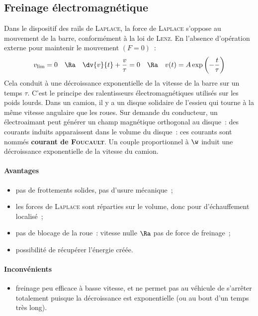 \documentclass[../main/main.tex]{subfiles}
\begin{document}
\subsection{Freinage électromagnétique}
\label{ssec:electrofrein}
Dans le dispositif des rails de \textsc{Laplace}, la force de \textsc{Laplace}
s'oppose au mouvement de la barre, conformément à la loi de \textsc{Lenz}. En
l'absence d'opération externe pour maintenir le mouvement $(F=0)$~:
\[
	v_{\rm lim} = 0
	\quad \Ra \quad
	\dv{v}{t} + \frac{v}{\tau} = 0
	\quad \Ra \quad
	v(t) = A\exp\left(-\frac{t}{\tau}\right)
\]
Cela conduit à une décroissance exponentielle de la vitesse de la barre sur un
temps $\tau$.
\bigbreak
C'est le principe des ralentisseurs électromagnétiques utilisés sur les poids
lourds. Dans un camion, il y a un disque solidaire de l'essieu qui tourne à la
même vitesse angulaire que les roues. Sur demande du conducteur, un
électroaimant peut générer un champ magnétique orthogonal au disque~: des
courants induits apparaissent dans le volume du disque~: ces courants sont
nommés \textbf{courant de \textsc{Foucault}}. Un couple proportionnel à $\w$
induit une décroissance exponentielle de la vitesse du camion.
\bigbreak
\paragraph*{Avantages}
\begin{itemize}[label=$\diamond$, leftmargin=10pt]
	\item pas de frottements solides, pas d'usure mécanique~;
	\item les forces de \textsc{Laplace} sont réparties sur le volume, donc pour
	      d'échauffement localisé~;
	\item pas de blocage de la roue~: vitesse nulle $\Ra $ pas de force de
	      freinage~;
	\item possibilité de récupérer l'énergie créée.
\end{itemize}
\bigbreak
\paragraph*{Inconvénients}
\begin{itemize}[label=$\diamond$, leftmargin=10pt]
	\item freinage peu efficace à basse vitesse, et ne permet pas au véhicule de
	      s'arrêter totalement puisque la décroissance est exponentielle (ou au bout
	      d'un temps très long).
\end{itemize}
\end{document}
